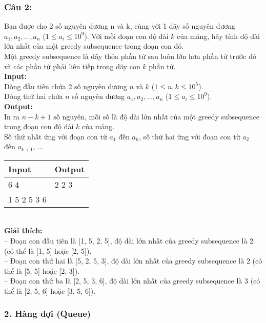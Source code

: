 \subsubsection*{Câu 2: }
Bạn được cho 2 số nguyên dương n và k, cùng với 1 dãy số nguyên dương $a_1, a_2, \ldots, a_n$ ($1 \leq a_i \leq 10^9$). Với mỗi đoạn con độ dài $k$ của mảng, hãy tính độ dài lớn nhất của một greedy subsequence trong đoạn con đó.\\
Một greedy subsequence là dãy thỏa phần tử sau luôn lớn hơn phần tử trước đó và các phần tử phải liên tiếp trong dãy con $k$ phần tử.\\
\textbf{Input:}\\
Dòng đầu tiên chứa 2 số nguyên dương $n$ và $k$ ($1 \leq n, k \leq 10^5$).\\
Dòng thứ hai chứa $n$ số nguyên dương $a_1, a_2, \ldots, a_n$ ($1 \leq a_i \leq 10^9$).\\
\textbf{Output:}\\
In ra $n - k + 1$ số nguyên, mỗi số là độ dài lớn nhất của một greedy subsequence trong đoạn con độ dài $k$ của mảng.\\
Số thứ nhất ứng với đoạn con từ $a_1$ đến $a_k$, số thứ hai ứng với đoạn con từ $a_2$ đến $a_{k+1}$, ...\\
\begin{table}[h!]
    \centering
    \begin{tabularx}{0.8\textwidth}{|X|X|}
        \hline
        \textbf{Input} & \textbf{Output} \\
        \hline
        6 4 & 2 2 3 \\
        1 5 2 5 3 6 &  \\
        \hline
    \end{tabularx}
\end{table}\\
\textbf{Giải thích:}\\
-- Đoạn con đầu tiên là [1, 5, 2, 5], độ dài lớn nhất của greedy subsequence là 2 (có thể là [1, 5] hoặc [2, 5]).\\
-- Đoạn con thứ hai là [5, 2, 5, 3], độ dài lớn nhất của greedy subsequence là 2 (có thể là [5, 5] hoặc [2, 3]).\\
-- Đoạn con thứ ba là [2, 5, 3, 6], độ dài lớn nhất của greedy subsequence là 3 (có thể là [2, 5, 6] hoặc [3, 5, 6]).
\subsubsection*{2. Hàng đợi (Queue)}
